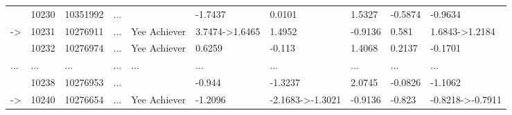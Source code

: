\documentclass[6pt,a4paper]{article}
\begin{document}
{\begin{longtable}{llllllllll}
&10230&10351992&...&&-1.7437&0.0101&1.5327&-0.5874&-0.9634\tabularnewline
-\textgreater &10231&10276911&...&Yee Achiever&3.7474-\textgreater 1.6465&1.4952&-0.9136&0.581&1.6843-\textgreater 1.2184\tabularnewline
&10232&10276974&...&Yee Achiever&0.6259&-0.113&1.4068&0.2137&-0.1701\tabularnewline
...&...&...&...&...&...&...&...&...&...\tabularnewline
&10238&10276953&...&&-0.944&-1.3237&2.0745&-0.0826&-1.1062\tabularnewline
-\textgreater &10240&10276654&...&Yee Achiever&-1.2096&-2.1683-\textgreater -1.3021&-0.9136&-0.823&-0.8218-\textgreater -0.7911\tabularnewline
\hline
\end{longtable}}
\end{document}

